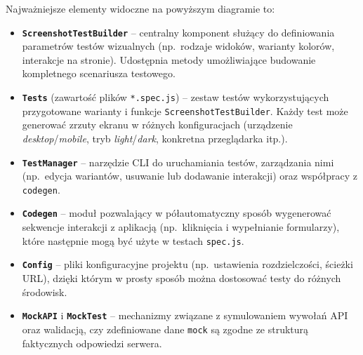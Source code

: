\documentclass[12pt]{report}
\begin{document}
Najważniejsze elementy widoczne na powyższym diagramie to:
\begin{itemize}
   \item \textbf{\texttt{ScreenshotTestBuilder}} -- centralny komponent służący do definiowania parametrów testów wizualnych (np.~rodzaje widoków, warianty kolorów, interakcje na stronie). Udostępnia metody umożliwiające budowanie kompletnego scenariusza testowego.
   \item \textbf{\texttt{Tests}} (zawartość plików \texttt{*.spec.js}) -- zestaw testów wykorzystujących przygotowane warianty i funkcje \texttt{ScreenshotTestBuilder}. Każdy test może generować zrzuty ekranu w różnych konfiguracjach (urządzenie \emph{desktop}/\emph{mobile}, tryb \emph{light}/\emph{dark}, konkretna przeglądarka itp.).
   \item \textbf{\texttt{TestManager}} -- narzędzie CLI do uruchamiania testów, zarządzania nimi (np.~edycja wariantów, usuwanie lub dodawanie interakcji) oraz współpracy z \texttt{codegen}.
   \item \textbf{\texttt{Codegen}} -- moduł pozwalający w półautomatyczny sposób wygenerować sekwencje interakcji z aplikacją (np.~kliknięcia i wypełnianie formularzy), które następnie mogą być użyte w testach \texttt{spec.js}.
   \item \textbf{\texttt{Config}} -- pliki konfiguracyjne projektu (np.~ustawienia rozdzielczości, ścieżki URL), dzięki którym w prosty sposób można dostosować testy do różnych środowisk.
   \item \textbf{\texttt{MockAPI}} i \textbf{\texttt{MockTest}} -- mechanizmy związane z symulowaniem wywołań API oraz walidacją, czy zdefiniowane dane \texttt{mock} są zgodne ze strukturą faktycznych odpowiedzi serwera.
\end{itemize}
\end{document}
